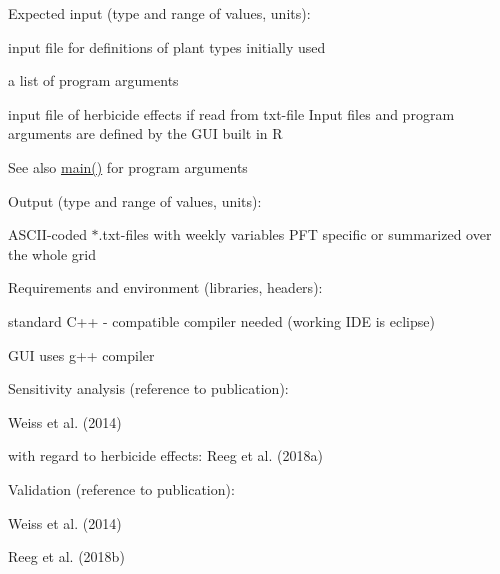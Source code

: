\begin{DoxyParagraph}{Expected input (type and range of values, units)\+:}

\begin{DoxyItemize}
\item input file for definitions of plant types initially used
\item a list of program arguments
\item input file of herbicide effects if read from txt-\/file Input files and program arguments are defined by the G\+UI built in R
\end{DoxyItemize}
\end{DoxyParagraph}
\begin{DoxySeeAlso}{See also}
\mbox{\hyperlink{_g_m_herbicide_effect_8cpp_a0ddf1224851353fc92bfbff6f499fa97}{main()}} for program arguments
\end{DoxySeeAlso}
\begin{DoxyParagraph}{Output (type and range of values, units)\+:}

\begin{DoxyItemize}
\item A\+S\+C\+I\+I-\/coded $\ast$.txt-\/files with weekly variables P\+FT specific or summarized over the whole grid
\end{DoxyItemize}
\end{DoxyParagraph}
\begin{DoxyParagraph}{Requirements and environment (libraries, headers)\+:}

\begin{DoxyItemize}
\item standard C++ -\/ compatible compiler needed (working I\+DE is eclipse)
\item G\+UI uses g++ compiler
\end{DoxyItemize}
\end{DoxyParagraph}
\begin{DoxyParagraph}{Sensitivity analysis (reference to publication)\+:}

\begin{DoxyItemize}
\item Weiss et al. (2014)
\item with regard to herbicide effects\+: Reeg et al. (2018a)
\end{DoxyItemize}
\end{DoxyParagraph}
\begin{DoxyParagraph}{Validation (reference to publication)\+:}

\begin{DoxyItemize}
\item Weiss et al. (2014)
\item Reeg et al. (2018b)
\end{DoxyItemize}
\end{DoxyParagraph}
